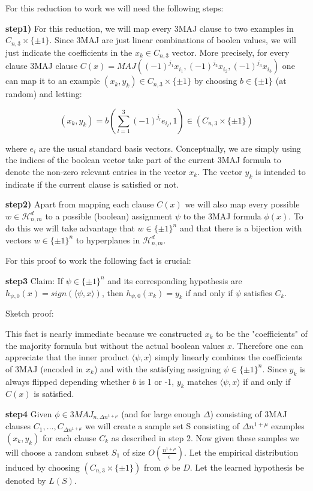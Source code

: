 \documentclass[12pt]{report}
\begin{document}
For this reduction to work we will need the following steps:

\textbf{step1)} For this reduction, we will map every 3MAJ clause to two examples in $C_{n,3} \times \{ \pm 1 \}$. Since 3MAJ are just linear combinations of boolen values, we will just indicate the coefficients in the $x_k \in C_{n,3}$ vector. More precisely, for every clause 3MAJ clause $ C(x) = MAJ( (-1)^{j_1}x_{i_1} , (-1)^{j_2}x_{i_2} , (-1)^{j_3}x_{i_3} )$ one can map it to an example $(x_k , y_k) \in C_{n , 3} \times \{ \pm 1\}$ by choosing $b \in \{ \pm 1\}$ (at random) and letting:

$$(x_k, y_k) = b (\sum^3_{l=1} (-1)^{j_l} e_{i_l}, 1) \in (C_{n,3} \times \{ \pm 1 \})$$

where $e_i$ are the usual standard basis vectors.
Conceptually, we are simply using the indices of the boolean vector take part of the current 3MAJ formula to denote the non-zero relevant entries in the vector $x_k$.
The vector $y_k$ is intended to indicate if the current clause is satisfied or not.

\textbf{step2)} Apart from mapping each clause $C(x)$ we will also map every possible $w \in\mathcal{H}^d_{n,m}$ to a possible (boolean) assignment $\psi $ to the 3MAJ formula $\phi(x)$. 
To do this we will take advantage that $w \in \{ \pm 1 \}^n $ and that there is a bijection with vectors $w \in \{ \pm 1 \}^n $ to hyperplanes in $\mathcal{H}^d_{n,m}$.

For this proof to work the following fact is crucial:

\textbf{step3} Claim: If $\psi \in \{ \pm 1 \}^n $ and its corresponding hypothesis are $h_{\psi, 0} (x) = sign ( \langle \psi , x \rangle )$, then $h_{\psi, 0} (x_k) = y_k$ if and only if $\psi$ satisfies $C_k$. 

Sketch proof: 

This fact is nearly immediate because we constructed $x_k$ to be the "coefficients" of the majority formula but without the actual boolean values $x$. Therefore one can appreciate that the inner product  $ \langle \psi , x \rangle $ simply linearly combines the coefficients of 3MAJ (encoded in $x_k$) and with the satisfying assigning $\psi \in \{ \pm 1\}^n$. Since $y_k$ is always flipped depending whether $b$ is 1 or -1, $y_k$ matches $\langle \psi , x \rangle $ if and only if $C(x)$ is satisfied.  

\textbf{step4} Given $\phi \in 3MAJ_{n, \Delta n^{1 + \mu}}$ (and for large enough $\Delta$) consisting of 3MAJ clauses $C_1, ..., C_{\Delta n^{1 + \mu}}$ we will create a sample set S consisting of $\Delta n^{1 + \mu}$ examples $(x_k, y_k)$ for each clause $C_k$ as described in step 2. Now given these samples we will choose a random subset $S_1$ of size $O(\frac{n^{1+\mu}}{\epsilon} )$. Let the empirical distribution induced by choosing $(C_{n,3} \times \{ \pm 1\})$ from $\phi$ be $D$. Let the learned hypothesis be denoted by $L(S)$.
\end{document}
